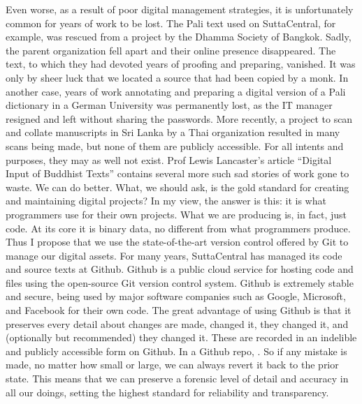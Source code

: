 {}Even worse, as a result of poor digital management strategies, it is unfortunately common for years of work to be lost. The Pali text used on SuttaCentral, for example, was rescued from a project by the Dhamma Society of Bangkok. Sadly, the parent organization fell apart and their online presence disappeared. The text, to which they had devoted years of proofing and preparing, vanished. It was only by sheer luck that we located a source that had been copied by a monk. In another case, years of work annotating and preparing a digital version of a Pali dictionary in a German University was permanently lost, as the IT manager resigned and left without sharing the passwords. More recently, a project to scan and collate manuscripts in Sri Lanka by a Thai organization resulted in many scans being made, but none of them are publicly accessible. For all intents and purposes, they may as well not exist. Prof Lewis Lancaster’s article “Digital Input of Buddhist Texts” contains several more such sad stories of work gone to waste.\markdownRendererInterblockSeparator
{}We can do better. What, we should ask, is the gold standard for creating and maintaining digital projects? In my view, the answer is this: it is what programmers use for their own projects. What we are producing is, in fact, just code. At its core it is binary data, no different from what programmers produce. Thus I propose that we use the state-of-the-art version control offered by Git to manage our digital assets.\markdownRendererInterblockSeparator
{}\markdownRendererInterblockSeparator
{}For many years, SuttaCentral has managed its code and source texts at Github. Github is a public cloud service for hosting code and files using the open-source Git version control system. Github is extremely stable and secure, being used by major software companies such as Google, Microsoft, and Facebook for their own code.\markdownRendererInterblockSeparator
{}The great advantage of using Github is that it preserves every detail about  changes are made,  changed it,  they changed it, and (optionally but recommended)  they changed it. These are recorded in an indelible and publicly accessible form on Github. In a Github repo, . So if any mistake is made, no matter how small or large, we can always revert it back to the prior state. This means that we can preserve a forensic level of detail and accuracy in all our doings, setting the highest standard for reliability and transparency.\markdownRendererInterblockSeparator
